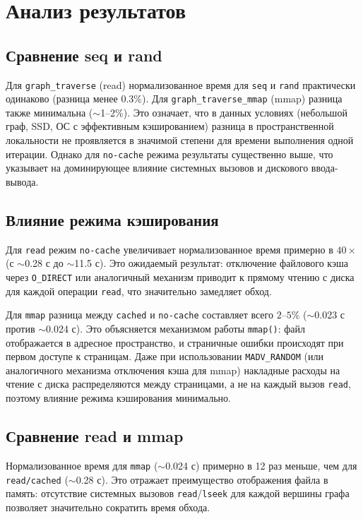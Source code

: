 \documentclass[12pt,a4paper]{article}
\begin{document}
\section{Анализ результатов}

\subsection{Сравнение seq и rand}
Для \texttt{graph\_traverse} (read) нормализованное время для \texttt{seq} и \texttt{rand} практически одинаково (разница менее 0.3\%). Для \texttt{graph\_traverse\_mmap} (mmap) разница также минимальна ($\sim$1--2\%). Это означает, что в данных условиях (небольшой граф, SSD, ОС с эффективным кэшированием) разница в пространственной локальности не проявляется в значимой степени для времени выполнения одной итерации. Однако для \texttt{no-cache} режима результаты существенно выше, что указывает на доминирующее влияние системных вызовов и дискового ввода-вывода.

\subsection{Влияние режима кэширования}
Для \texttt{read} режим \texttt{no-cache} увеличивает нормализованное время примерно в $40\times$ (с $\sim$0.28 с до $\sim$11.5 с). Это ожидаемый результат: отключение файлового кэша через \texttt{O\_DIRECT} или аналогичный механизм приводит к прямому чтению с диска для каждой операции \texttt{read}, что значительно замедляет обход.

Для \texttt{mmap} разница между \texttt{cached} и \texttt{no-cache} составляет всего $2$--$5$\% ($\sim$0.023 с против $\sim$0.024 с). Это объясняется механизмом работы \texttt{mmap()}: файл отображается в адресное пространство, и страничные ошибки происходят при первом доступе к страницам. Даже при использовании \texttt{MADV\_RANDOM} (или аналогичного механизма отключения кэша для mmap) накладные расходы на чтение с диска распределяются между страницами, а не на каждый вызов \texttt{read}, поэтому влияние режима кэширования минимально.

\subsection{Сравнение read и mmap}
Нормализованное время для \texttt{mmap} ($\sim$0.024 с) примерно в 12 раз меньше, чем для \texttt{read/cached} ($\sim$0.28 с). Это отражает преимущество отображения файла в память: отсутствие системных вызовов \texttt{read}/\texttt{lseek} для каждой вершины графа позволяет значительно сократить время обхода.
\end{document}
